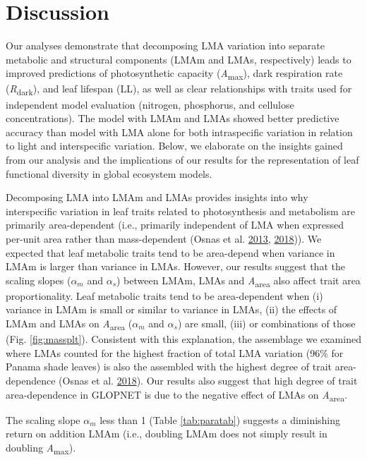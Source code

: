 \documentclass[
  12pt,
]{article}
\begin{document}
\hypertarget{discussion}{%
\section{Discussion}\label{discussion}}

Our analyses demonstrate that decomposing LMA variation into separate metabolic and structural components (LMAm and LMAs, respectively) leads to improved predictions of photosynthetic capacity (\emph{A}\textsubscript{max}), dark respiration rate (\emph{R}\textsubscript{dark}), and leaf lifespan (LL), as well as clear relationships with traits used for independent model evaluation (nitrogen, phosphorus, and cellulose concentrations).
The model with LMAm and LMAs showed better predictive accuracy than model with LMA alone for both intraspecific variation in relation to light and interspecific variation.
Below, we elaborate on the insights gained from our analysis and the implications of our results for the representation of leaf functional diversity in global ecosystem models.

Decomposing LMA into LMAm and LMAs provides insights into why interspecific variation in leaf traits related to photosynthesis and metabolism are primarily area-dependent (i.e., primarily independent of LMA when expressed per-unit area rather than mass-dependent (Osnas et al. \protect\hyperlink{ref-Osnas2013}{2013}, \protect\hyperlink{ref-Osnas2018}{2018})).
We expected that leaf metabolic traits tend to be area-depend when variance in LMAm is larger than variance in LMAs.
However, our results suggest that the scaling slopes (\(\alpha_m\) and \(\alpha_s\)) between LMAm, LMAs and \emph{A}\textsubscript{area} also affect trait area proportionality.
Leaf metabolic traits tend to be area-dependent when (i) variance in LMAm is small or similar to variance in LMAs, (ii) the effects of LMAm and LMAs on \emph{A}\textsubscript{area} (\(\alpha_m\) and \(\alpha_s\)) are small, (iii) or combinations of those (Fig. \ref{fig:massplt}).
Consistent with this explanation, the assemblage we examined where LMAs counted for the highest fraction of total LMA variation (96\% for Panama shade leaves) is also the assembled with the highest degree of trait area-dependence (Osnas et al. \protect\hyperlink{ref-Osnas2018}{2018}).
Our results also suggest that high degree of trait area-dependence in GLOPNET is due to the negative effect of LMAs on \emph{A}\textsubscript{area}.

The scaling slope \(\alpha_m\) less than 1 (Table \ref{tab:paratab}) suggests a diminishing return on addition LMAm (i.e., doubling LMAm does not simply result in doubling \emph{A}\textsubscript{max}).
\end{document}
